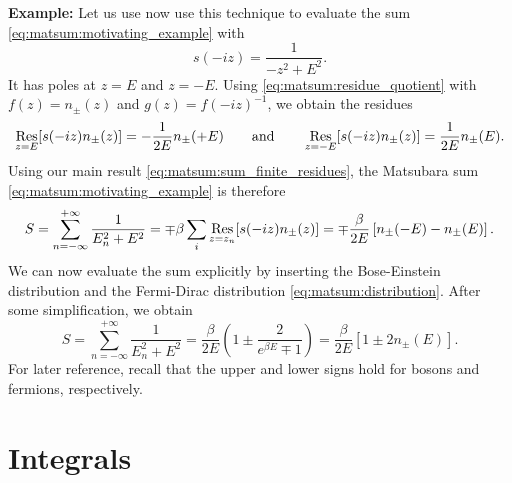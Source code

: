 \textbf{Example:}
Let us use now use this technique to evaluate the sum \eqref{eq:matsum:motivating_example} with
\begin{equation}
	s(-iz) = \frac{1}{-z^2 + E^2} .
\end{equation}
It has poles at $z = E$ and $z = -E$.
Using \cref{eq:matsum:residue_quotient} with $f(z) = n_\pm(z)$ and $g(z) = f(-iz)^{-1}$, we obtain the residues
\begin{equation}
	\operatorname*{Res}_{z =  E}[s(-iz) n_\pm(z)] = -\frac{1}{2 E} n_\pm(+E) 
	\qquad \text{and} \qquad
	\operatorname*{Res}_{z = -E}[s(-iz) n_\pm(z)] =  \frac{1}{2 E} n_\pm( E) .
\end{equation}
Using our main result \eqref{eq:matsum:sum_finite_residues}, the Matsubara sum \eqref{eq:matsum:motivating_example} is therefore
\begin{equation}
	S = \sum_{n=-\infty}^{+\infty} \frac{1}{E_n^2 + E^2}
	  = \mp \beta \sum_i \operatorname*{Res}_{z=z_n}[s(-i z) n_\pm(z)]
	  = \mp \frac{\beta}{2 E} \left[ n_\pm(-E) - n_\pm(E) \right] .
\end{equation}
We can now evaluate the sum explicitly by inserting the Bose-Einstein distribution and the Fermi-Dirac distribution \eqref{eq:matsum:distribution}.
After some simplification, we obtain
\begin{equation}
	S = \sum_{n=-\infty}^{+\infty} \frac{1}{E_n^2 + E^2}
	  = \frac{\beta}{2 E} \left( 1 \pm \frac{2}{e^{\beta E} \mp 1} \right)
	  = \frac{\beta}{2 E} \left[ 1 \pm 2 n_\pm(E) \right] .
\label{eq:matsum:example_result}
\end{equation}
For later reference, recall that the upper and lower signs hold for bosons and fermions, respectively.

\chapter{Integrals}
\label{chap:integrals}

\newcommand\formulawithcomment[4]{%
\textbf{#1:}
#2
\textbf{#3:} #4
}

\newcommand\formulawithproof[3]{\formulawithcomment{#1}{#2}{Proof}{#3}}
\newcommand\formulawithreference[3]{\formulawithcomment{#1}{#2}{Reference}{#3}}

